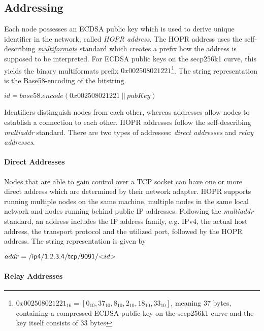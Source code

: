 \subsection{Addressing}
\label{sec:p2p:addressing}

Each node possesses an ECDSA public key which is used to derive unique identifier in the network, called \textit{HOPR address}. The HOPR address uses the self-describing \href{https://multiformats.io}{\textit{multiformats}} standard which creates a prefix how the address is supposed to be interpreted. For ECDSA public keys on the secp256k1 curve, this yields the binary multiformats prefix $0x002508021221$\footnote{$0x002508021221_{16} = [ 0_{10}, 37_{10}, 8_{10}, 2_{10}, 18_{10}, 33_{10} ]$, meaning 37 bytes, containing a compressed ECDSA public key on the secp256k1 curve and the key itself consists of 33 bytes}. The string representation is the \href{https://en.bitcoin.it/wiki/Base58Check_encoding}{Base58}-encoding of the bitstring.

\begin{center}
    $id = base58.encode(0x002508021221 \ || \ pubKey)$
\end{center}

Identifiers distinguish nodes from each other, whereas addresses allow nodes to establish a connection to each other. HOPR addresses follow the self-describing \textit{multiaddr} standard. There are two types of addresses: \textit{direct addresses} and \textit{relay addresses}.

\paragraph{Direct Addresses}

Nodes that are able to gain control over a TCP socket can have one or more direct address which are determined by their network adapter. HOPR supports running multiple nodes on the same machine, multiple nodes in the same local network and nodes running behind public IP addresses. Following the \textit{multiaddr} standard, an address includes the IP address family, e.g. IPv4, the actual host address, the transport protocol and the utilized port, followed by the HOPR address. The string representation is given by

\begin{center}
    $addr = \mathsf{/ip4/1.2.3.4/tcp/9091/}\text{\textless$id$\textgreater{}}$
\end{center}

\paragraph{Relay Addresses}

